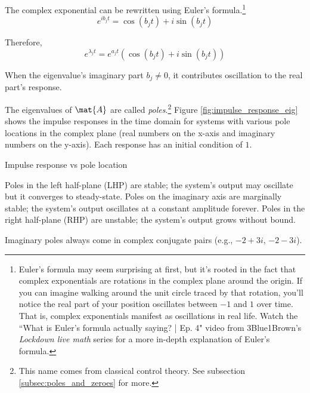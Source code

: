 The complex exponential can be rewritten using Euler's formula.\footnote{Euler's
formula may seem surprising at first, but it's rooted in the fact that complex
exponentials are rotations in the complex plane around the origin. If you can
imagine walking around the unit circle traced by that rotation, you'll notice
the real part of your position oscillates between $-1$ and $1$ over time. That
is, complex exponentials manifest as oscillations in real life. Watch the ``What
is Euler's formula actually saying? | Ep. 4" video from 3Blue1Brown's
\textit{Lockdown live math} series \cite{bib:eulers_formula} for a more in-depth
explanation of Euler's formula.}
\begin{equation*}
  e^{i b_j t} = \cos(b_j t) + i \sin(b_j t)
\end{equation*}

Therefore,
\begin{equation*}
  e^{\lambda_j t} = e^{a_j t} (\cos(b_j t) + i \sin(b_j t))
\end{equation*}

When the eigenvalue's imaginary part $b_j \neq 0$, it contributes oscillation to
the real part's response.

The eigenvalues of $\mat{A}$ are called \textit{poles}.\footnote{This name comes
from classical control theory. See subsection \ref{subsec:poles_and_zeroes} for
more.} Figure \ref{fig:impulse_response_eig} shows the \glspl{impulse response}
in the time domain for \glspl{system} with various pole locations in the complex
plane (real numbers on the x-axis and imaginary numbers on the y-axis). Each
response has an initial condition of $1$.
\begin{bookfigure}
  
  \caption{Impulse response vs pole location}
  \label{fig:impulse_response_eig}
\end{bookfigure}

Poles in the left half-plane (LHP) are stable; the \gls{system}'s output may
oscillate but it converges to steady-state. Poles on the imaginary axis are
marginally stable; the \gls{system}'s output oscillates at a constant amplitude
forever. Poles in the right half-plane (RHP) are unstable; the \gls{system}'s
output grows without bound.
\begin{remark}
  Imaginary poles always come in complex conjugate pairs (e.g., $-2 + 3i$,
  $-2 - 3i$).
\end{remark}
